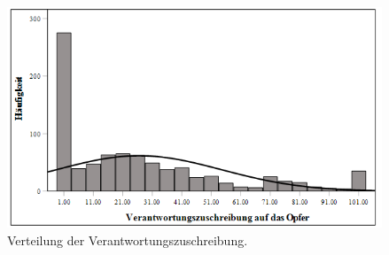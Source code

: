 \begin{figure}[htb]
    \centering
        \includegraphics[width=0.8\linewidth]{Histogramm - VicBlame.png}
        \caption[Histogramm Verantwortungszuschreibung]{Verteilung der Verantwortungszuschreibung.}
        \label{Histogramm VicBlame}
\end{figure}

